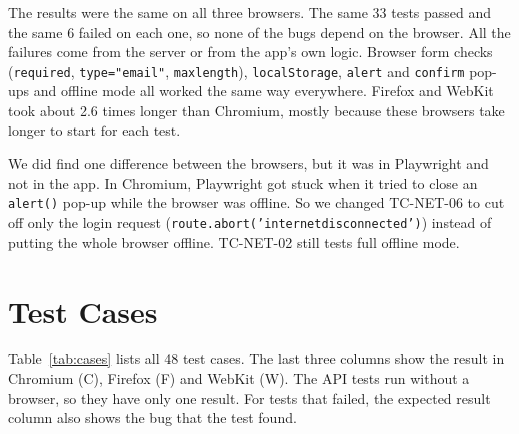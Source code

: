 \documentclass[12pt,a4paper,oneside]{report}
\newcommand{\code}[1]{\texttt{#1}}
\begin{document}
The results were the same on all three browsers. The same 33 tests passed and
the same 6 failed on each one, so none of the bugs depend on the browser. All
the failures come from the server or from the app's own logic. Browser form
checks (\code{required}, \code{type="email"}, \code{maxlength}),
\code{localStorage}, \code{alert} and \code{confirm} pop-ups and offline mode
all worked the same way everywhere. Firefox and WebKit took about 2.6 times
longer than Chromium, mostly because these browsers take longer to start for
each test.

We did find one difference between the browsers, but it was in Playwright and
not in the app. In Chromium, Playwright got stuck when it tried to close an
\code{alert()} pop-up while the browser was offline. So we changed TC-NET-06 to
cut off only the login request (\code{route.abort('internetdisconnected')})
instead of putting the whole browser offline. TC-NET-02 still tests full
offline mode.

\chapter{Test Cases}\label{ch:cases}

Table~\ref{tab:cases} lists all 48 test cases. The last three columns show the
result in Chromium (C), Firefox (F) and WebKit (W). The API tests run without a
browser, so they have only one result. For tests that failed, the expected
result column also shows the bug that the test found.
\end{document}
